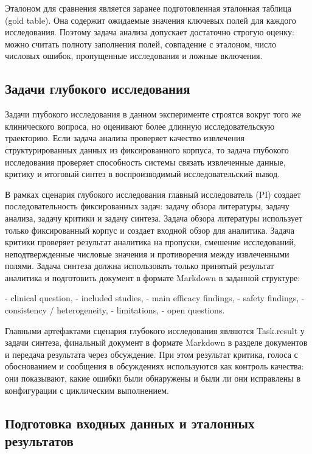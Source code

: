 Эталоном для сравнения является заранее подготовленная эталонная таблица (gold table). Она содержит ожидаемые значения ключевых полей для каждого исследования. Поэтому задача анализа допускает достаточно строгую оценку: можно считать полноту заполнения полей, совпадение с эталоном, число числовых ошибок, пропущенные исследования и ложные включения.

\subsection{Задачи глубокого исследования}

Задачи глубокого исследования в данном эксперименте строятся вокруг того же клинического вопроса, но оценивают более длинную исследовательскую траекторию. Если задача анализа проверяет качество извлечения структурированных данных из фиксированного корпуса, то задача глубокого исследования проверяет способность системы связать извлеченные данные, критику и итоговый синтез в воспроизводимый исследовательский вывод.

В рамках сценария глубокого исследования главный исследователь (PI) создает последовательность фиксированных задач: задачу обзора литературы, задачу анализа, задачу критики и задачу синтеза. Задача обзора литературы использует только фиксированный корпус и создает входной обзор для аналитика. Задача критики проверяет результат аналитика на пропуски, смешение исследований, неподтвержденные числовые значения и противоречия между извлеченными полями. Задача синтеза должна использовать только принятый результат аналитика и подготовить документ в формате Markdown в заданной структуре:

- clinical question,
- included studies,
- main efficacy findings,
- safety findings,
- consistency / heterogeneity,
- limitations,
- open questions.

Главными артефактами сценария глубокого исследования являются Task.result у задачи синтеза, финальный документ в формате Markdown в разделе документов и передача результата через обсуждение. При этом результат критика, голоса с обоснованием и сообщения в обсуждениях используются как контроль качества: они показывают, какие ошибки были обнаружены и были ли они исправлены в конфигурации с циклическим выполнением.

\subsection{Подготовка входных данных и эталонных результатов}

